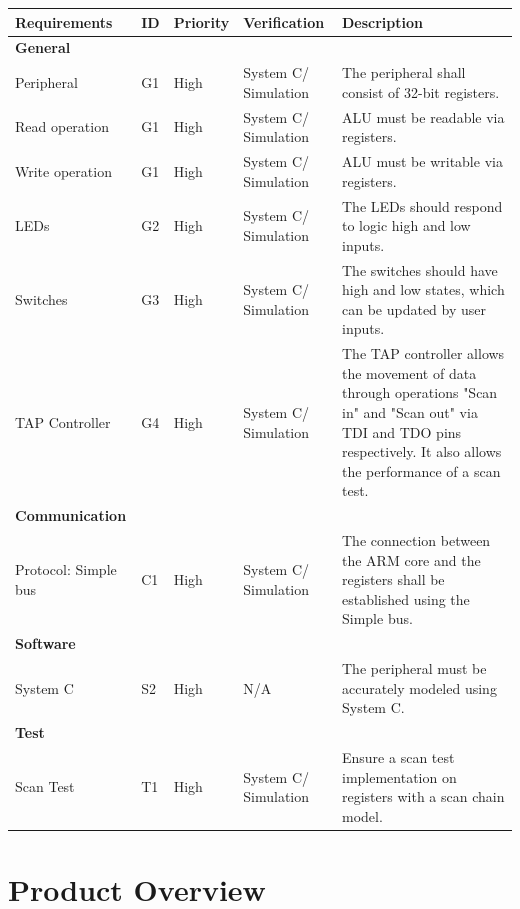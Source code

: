 \documentclass[a4paper,12pt,english]{report}
\begin{document}
\begin{center}
    \small %
    \begin{longtable}{|p{2.5cm}|p{1.5cm}|p{1.5cm}|p{4cm}|p{5.5cm}|}
    \hline
    \textbf{Requirements} & \textbf{ID} & \textbf{Priority} & \textbf{Verification} & \textbf{Description} \\ \hline
\textbf{General} & ~ & ~ & ~ & ~ \\ \hline
Peripheral & G1 & High & System C/ Simulation & The peripheral shall consist of  32-bit registers. 
 \\ \hline
 Read operation & G1 & High & System C/ Simulation & ALU must be readable via registers.
 \\ \hline
Write operation & G1 & High & System C/ Simulation & ALU must be writable via registers.
 \\ \hline
LEDs & G2 & High & System C/ Simulation & The LEDs should respond to logic high and low inputs. \\ \hline
Switches & G3 & High & System C/ Simulation & The switches should have high and low states, which can be updated by user inputs. \\ \hline
TAP Controller & G4 & High & System C/ Simulation & The TAP controller allows the movement of data through operations "Scan in" and "Scan out" via TDI and TDO pins respectively. It also allows the performance of a scan test. \\ \hline
\textbf{Communication} & ~ & ~ & ~ & ~ \\ \hline
Protocol: Simple bus & C1 & High & System C/ Simulation & The connection between the ARM core and the registers shall be established using the Simple bus.
 \\ \hline
\textbf{Software} & ~ & ~ & ~ & ~ \\ \hline
System C & S2 & High & N/A & The peripheral must be accurately modeled using System C.
 \\ \hline
\textbf{Test} & ~ & ~ & ~ & ~ \\ \hline
Scan Test & T1 & High & System C/ Simulation & Ensure a scan test implementation on registers with a scan chain model. \\ \hline
\end{longtable}
\end{center}


\chapter{Product Overview}
\end{document}
